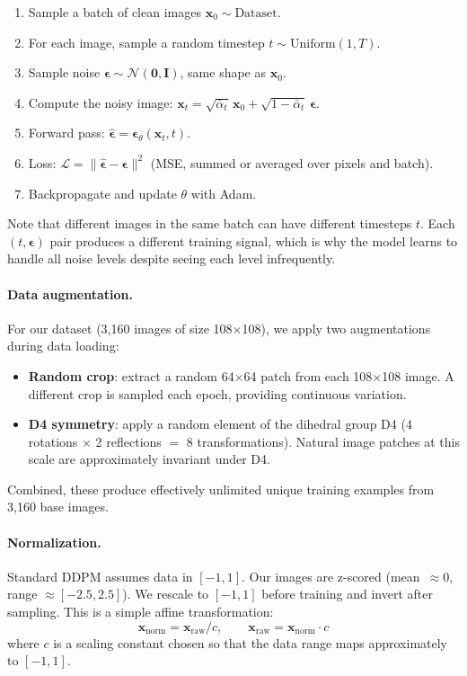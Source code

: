 \documentclass[11pt]{article}
\newcommand{\xb}{\mathbf{x}}
\newcommand{\eb}{\boldsymbol{\epsilon}}
\newcommand{\Ib}{\mathbf{I}}
\newcommand{\alphabar}{\bar{\alpha}}
\begin{document}
\begin{enumerate}[nosep]
    \item Sample a batch of clean images $\xb_0 \sim \text{Dataset}$.
    \item For each image, sample a random timestep $t \sim \text{Uniform}(1, T)$.
    \item Sample noise $\eb \sim \mathcal{N}(\mathbf{0}, \Ib)$, same shape as $\xb_0$.
    \item Compute the noisy image:
          $\xb_t = \sqrt{\alphabar_t}\, \xb_0 + \sqrt{1 - \alphabar_t}\, \eb$.
    \item Forward pass: $\hat{\eb} = \eb_\theta(\xb_t, t)$.
    \item Loss: $\mathcal{L} = \|\hat{\eb} - \eb\|^2$ (MSE, summed or averaged over pixels and batch).
    \item Backpropagate and update $\theta$ with Adam.
\end{enumerate}

Note that different images in the same batch can have different timesteps $t$.
Each $(t, \eb)$ pair produces a different training signal, which is why the
model learns to handle all noise levels despite seeing each level infrequently.

\paragraph{Data augmentation.}
For our dataset (3{,}160 images of size 108$\times$108), we apply two augmentations
during data loading:
\begin{itemize}[nosep]
    \item \textbf{Random crop}: extract a random 64$\times$64 patch from each
          108$\times$108 image. A different crop is sampled each epoch, providing
          continuous variation.
    \item \textbf{D4 symmetry}: apply a random element of the dihedral group D4
          (4 rotations $\times$ 2 reflections $=$ 8 transformations). Natural image
          patches at this scale are approximately invariant under D4.
\end{itemize}
Combined, these produce effectively unlimited unique training examples from 3{,}160
base images.

\paragraph{Normalization.}
Standard DDPM assumes data in $[-1, 1]$. Our images are z-scored (mean~$\approx 0$,
range $\approx [-2.5, 2.5]$). We rescale to $[-1, 1]$ before training and
invert after sampling. This is a simple affine transformation:
\begin{equation}
    \xb_{\text{norm}} = \xb_{\text{raw}} / c, \qquad
    \xb_{\text{raw}} = \xb_{\text{norm}} \cdot c
\end{equation}
where $c$ is a scaling constant chosen so that the data range maps approximately
to $[-1, 1]$.
\end{document}

